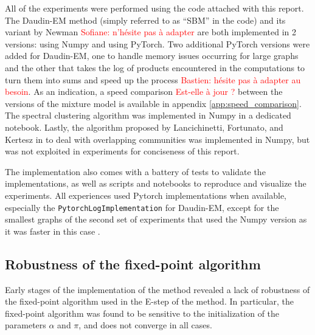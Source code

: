 \documentclass[switch, 12pt]{article}
\begin{document}
\begin{multicols}{2}
    All of the experiments were performed using the code attached with this report. The Daudin-EM method (simply referred to as ``SBM'' in the code) and its variant by Newman \textcolor{red}{Sofiane: n'hésite pas à adapter} are both implemented in 2 versions: using Numpy and using PyTorch. Two additional PyTorch versions were added for Daudin-EM, one to handle memory issues occurring for large graphs and the other that takes the log of products encountered in the computations to turn them into sums and speed up the process \textcolor{red}{Bastien: hésite pas à adapter au besoin}. As an indication, a speed comparison \textcolor{red}{Est-elle à jour ?} between the versions of the mixture model is available in appendix \ref{app:speed_comparison}. The spectral clustering algorithm was implemented in Numpy in a dedicated notebook. Lastly, the algorithm proposed by Lancichinetti, Fortunato, and Kertesz in \cite{lancichinetti_detecting_2009} to deal with overlapping communities was implemented in Numpy, but was not exploited in experiments for conciseness of this report. %

    The implementation also comes with a battery of tests to validate the implementations, as well as scripts and notebooks to reproduce and visualize the experiments. All experiences used Pytorch implementations when available, especially the \texttt{PytorchLogImplementation} for Daudin-EM, except for the smallest graphs of the second set of experiments that used the Numpy version as it was faster in this case
    .

    \subsection{Robustness of the fixed-point algorithm}
    \label{subsec:robustness}

    Early stages of the implementation of the method revealed a lack of robustness of the fixed-point algorithm used in the E-step of the method. In particular, the fixed-point algorithm was found to be sensitive to the initialization of the parameters $\alpha$ and $\pi$, and does not converge in all cases.


\end{multicols}
\end{document}
